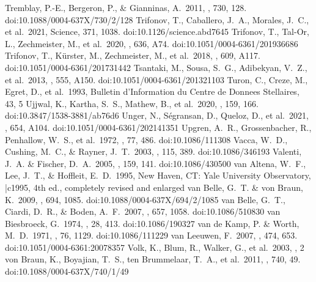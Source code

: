 \documentclass[twocolumn,tighten,twocolappendix]{aastex631}
\begin{document}
\begin{thebibliography}{}
 Tremblay, P.-E., Bergeron, P., \& Gianninas, A.\ 2011, \apj, 730, 128. doi:10.1088/0004-637X/730/2/128
 Trifonov, T., Caballero, J.~A., Morales, J.~C., et al.\ 2021, Science, 371, 1038. doi:10.1126/science.abd7645
 Trifonov, T., Tal-Or, L., Zechmeister, M., et al.\ 2020, \aap, 636, A74. doi:10.1051/0004-6361/201936686
 Trifonov, T., K{\"u}rster, M., Zechmeister, M., et al.\ 2018, \aap, 609, A117. doi:10.1051/0004-6361/201731442
 Tsantaki, M., Sousa, S.~G., Adibekyan, V.~Z., et al.\ 2013, \aap, 555, A150. doi:10.1051/0004-6361/201321103
 Turon, C., Creze, M., Egret, D., et al.\ 1993, Bulletin d'Information du Centre de Donnees Stellaires, 43, 5
 Ujjwal, K., Kartha, S.~S., Mathew, B., et al.\ 2020, \aj, 159, 166. doi:10.3847/1538-3881/ab76d6
 Unger, N., S{\'e}gransan, D., Queloz, D., et al.\ 2021, \aap, 654, A104. doi:10.1051/0004-6361/202141351
 Upgren, A.~R., Grossenbacher, R., Penhallow, W.~S., et al.\ 1972, \aj, 77, 486. doi:10.1086/111308
 Vacca, W.~D., Cushing, M.~C., \& Rayner, J.~T.\ 2003, \pasp, 115, 389. doi:10.1086/346193
 Valenti, J.~A. \& Fischer, D.~A.\ 2005, \apjs, 159, 141. doi:10.1086/430500
 van Altena, W.~F., Lee, J.~T., \& Hoffleit, E.~D.\ 1995, New Haven, CT: Yale University Observatory, |c1995, 4th ed., completely revised and enlarged
 van Belle, G.~T. \& von Braun, K.\ 2009, \apj, 694, 1085. doi:10.1088/0004-637X/694/2/1085
 van Belle, G.~T., Ciardi, D.~R., \& Boden, A.~F.\ 2007, \apj, 657, 1058. doi:10.1086/510830
 van Biesbroeck, G.\ 1974, \apjs, 28, 413. doi:10.1086/190327
 van de Kamp, P. \& Worth, M.~D.\ 1971, \aj, 76, 1129. doi:10.1086/111229
 van Leeuwen, F.\ 2007, \aap, 474, 653. doi:10.1051/0004-6361:20078357
 Volk, K., Blum, R., Walker, G., et al.\ 2003, , 2
 von Braun, K., Boyajian, T.~S., ten Brummelaar, T.~A., et al.\ 2011, \apj, 740, 49. doi:10.1088/0004-637X/740/1/49

\end{thebibliography}
\end{document}
